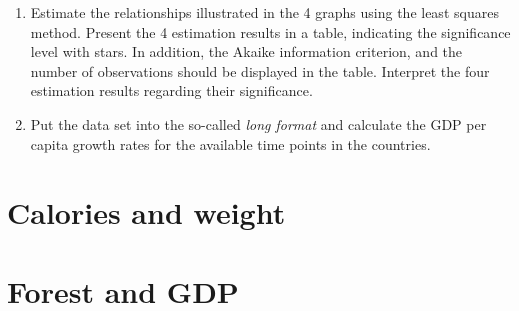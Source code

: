 \begin{enumerate}[1)]
	\item Estimate the relationships illustrated in the 4 graphs using the least squares method. Present the 4 estimation results in a table, indicating the significance level with stars. In addition, the Akaike information criterion, and the number of observations should be displayed in the table. Interpret the four estimation results regarding their significance. 
	\item Put the data set into the so-called \textit{long format} and calculate the GDP per capita growth rates for the available time points in the countries.
\end{enumerate}



\section{Calories and weight}\label{exe:calories}



\section{Forest and GDP}\label{exe:forest}



